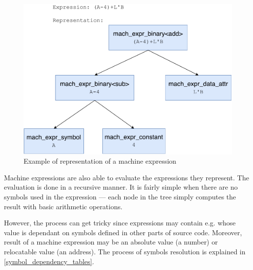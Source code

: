 \begin{figure}
	\centering
	\includegraphics[width=13cm]{img/mach_expr_example}
	\caption{Example of representation of a machine expression}
	\label{mach_expr_example}
\end{figure}

Machine expressions are also able to evaluate the expressions they represent. The evaluation is done in a recursive manner. It is fairly simple when there are no symbols used in the expression --- each node in the tree simply computes the result with basic arithmetic operations.

However, the process can get tricky since expressions may contain e.g.  whose value is dependant on symbols defined in other parts of source code. Moreover, result of a machine expression may be an absolute value (a number) or relocatable value (an address). The process of symbols resolution is explained in \cref{symbol_dependency_tables}.